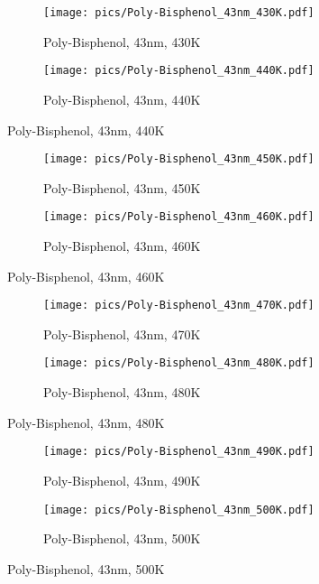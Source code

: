 \begin{figure}[!htb]
\centering
\begin{subfigure}[t]{.5\textwidth}
  \centering
  \texttt{[image: pics/Poly-Bisphenol\_43nm\_430K.pdf]}
  \caption{Poly-Bisphenol, 43nm, 430K}
  \label{fig:sub33}
\end{subfigure}%
\begin{subfigure}[t]{.5\textwidth}
  \centering
  \texttt{[image: pics/Poly-Bisphenol\_43nm\_440K.pdf]}
  \caption{Poly-Bisphenol, 43nm, 440K}
  \label{fig:sub34}
\end{subfigure}%
\end{figure}

\begin{figure}[!htb]
\centering
\begin{subfigure}[t]{.5\textwidth}
  \centering
  \texttt{[image: pics/Poly-Bisphenol\_43nm\_450K.pdf]}
  \caption{Poly-Bisphenol, 43nm, 450K}
  \label{fig:sub35}
\end{subfigure}%
\begin{subfigure}[t]{.5\textwidth}
  \centering
  \texttt{[image: pics/Poly-Bisphenol\_43nm\_460K.pdf]}
  \caption{Poly-Bisphenol, 43nm, 460K}
  \label{fig:sub36}
\end{subfigure}%
\end{figure}

\begin{figure}[!htb]
\centering
\begin{subfigure}[t]{.5\textwidth}
  \centering
  \texttt{[image: pics/Poly-Bisphenol\_43nm\_470K.pdf]}
  \caption{Poly-Bisphenol, 43nm, 470K}
  \label{fig:sub37}
\end{subfigure}%
\begin{subfigure}[t]{.5\textwidth}
  \centering
  \texttt{[image: pics/Poly-Bisphenol\_43nm\_480K.pdf]}
  \caption{Poly-Bisphenol, 43nm, 480K}
  \label{fig:sub38}
\end{subfigure}%
\end{figure}

\begin{figure}[!htb]
\centering
\begin{subfigure}[t]{.5\textwidth}
  \centering
  \texttt{[image: pics/Poly-Bisphenol\_43nm\_490K.pdf]}
  \caption{Poly-Bisphenol, 43nm, 490K}
  \label{fig:sub39}
\end{subfigure}%
\begin{subfigure}[t]{.5\textwidth}
  \centering
  \texttt{[image: pics/Poly-Bisphenol\_43nm\_500K.pdf]}
  \caption{Poly-Bisphenol, 43nm, 500K}
  \label{43nm_500K}
\end{subfigure}%
\end{figure}

